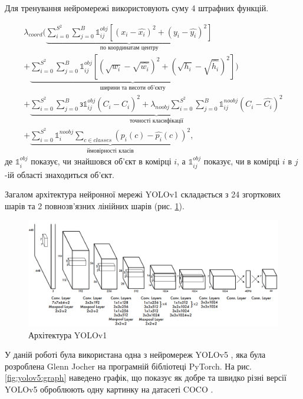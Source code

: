 Для тренування нейромережі використовують суму 4 штрафних функцій.

\begin{multline*}
    \lambda_{coord}(
    \underbrace{ \sum_{i=0}^{S^2} \sum_{j=0}^{B}
    \mathds{1}_{ij}^{obj} [(x_i - \widehat{x_i})^2 + (y_i - \widehat{y_i})^2]
    }_\textrm{по координатам центру}\\
    +
    \underbrace{
    \sum_{i=0}^{S^2} \sum_{j=0}^{B}
    \mathds{1}_{ij}^{obj} [(\sqrt{w_i} - \sqrt{\widehat{w_i}})^2 + (\sqrt{h_i} - \sqrt{\widehat{h_i}})^2]
    }_\textrm{ширини та висоти об'єкту}
    )\\
    +  \underbrace{
        \sum_{i=0}^{S^2} \sum_{j=0}^{B} з
        \mathds{1}_{ij}^{obj} (C_i - \widehat{C_i})^2
        +
        \lambda_{noobj} \sum_{i=0}^{S^2} \sum_{j=0}^{B} \mathds{1}_{ij}^{noobj} (C_i - \widehat{C_i})^2
    }_\textrm{точності класифікації}\\
    +  \underbrace{
    \sum_{i=0}^{S^2} \mathds{1}_{i}^{noobj}\sum_{c \in classes}(p_i(c) -  \widehat{p_i}(c))^2
    }_\textrm{ймовірності класів},
\end{multline*}
де $\mathds{1}_{i}^{obj}$ показує, чи знайшовся об'єкт в комірці $i$, а
$\mathds{1}_{ij}^{obj}$ показує, чи в комірці $i$ в $j$-ій області знаходиться об'єкт.

Загалом архітектура нейронної мережі YOLOv1 складається з 24 згорткових шарів та
2 повнозв'язних лінійних шарів (рис. \ref{fig:yolov1:architecture}).

\begin{figure}[H]
    \includegraphics[width=0.8\linewidth]{images/cnn_yolo2}
    \centering
    \caption{Архітектура YOLOv1 \cite{bib:yolov1}
        \label{fig:yolov1:architecture}
    }
\end{figure}

У даній роботі була використана одна з нейромереж YOLOv5 \cite{website:yolov5_pytorch}, яка була
розроблена Glenn Jocher на програмній бібліотеці PyTorch. На рис. \ref{fig:yolov5:graph}
наведено графік, що показує як добре та швидко різні версії YOLOv5 оброблюють одну картинку
на датасеті COCO \cite{website:coco_dataset}.

